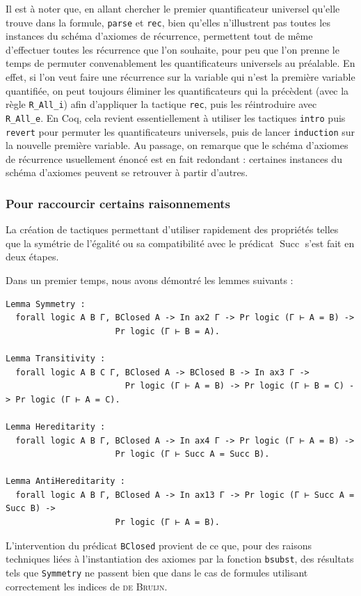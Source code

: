 \documentclass[a4paper]{article}
\DeclareMathOperator{\Succ}{\mathrm{Succ}}
\begin{document}
Il est à noter que, en allant chercher le premier quantificateur universel qu'elle trouve dans la formule, \verb+parse+ et \verb+rec+, bien qu'elles n'illustrent pas toutes les instances du schéma d'axiomes de récurrence, permettent tout de même d'effectuer toutes les récurrence que l'on souhaite, pour peu que l'on prenne le temps de permuter convenablement les quantificateurs universels au préalable. En effet, si l'on veut faire une récurrence sur la variable qui n'est la première variable quantifiée, on peut toujours éliminer les quantificateurs qui la précèdent (avec la règle \verb+R_All_i+) afin d'appliquer la tactique \verb+rec+, puis les réintroduire avec \verb+R_All_e+. En Coq, cela revient essentiellement à utiliser les tactiques \verb+intro+ puis \verb+revert+ pour permuter les quantificateurs universels, puis de lancer \verb+induction+ sur la nouvelle première variable. Au passage, on remarque que le schéma d'axiomes de récurrence usuellement énoncé est en fait redondant : certaines instances du schéma d'axiomes peuvent se retrouver à partir d'autres.

\subsubsection{Pour raccourcir certains raisonnements}

La création de tactiques permettant d'utiliser rapidement des propriétés telles que la symétrie de l'égalité ou sa compatibilité avec le prédicat $\Succ$ s'est fait en deux étapes.

Dans un premier temps, nous avons démontré les lemmes suivants :
\begin{verbatim}
Lemma Symmetry :
  forall logic A B Γ, BClosed A -> In ax2 Γ -> Pr logic (Γ ⊢ A = B) ->
                      Pr logic (Γ ⊢ B = A).

Lemma Transitivity :
  forall logic A B C Γ, BClosed A -> BClosed B -> In ax3 Γ ->
                        Pr logic (Γ ⊢ A = B) -> Pr logic (Γ ⊢ B = C) -> Pr logic (Γ ⊢ A = C).

Lemma Hereditarity :
  forall logic A B Γ, BClosed A -> In ax4 Γ -> Pr logic (Γ ⊢ A = B) ->
                      Pr logic (Γ ⊢ Succ A = Succ B).

Lemma AntiHereditarity :
  forall logic A B Γ, BClosed A -> In ax13 Γ -> Pr logic (Γ ⊢ Succ A = Succ B) ->
                      Pr logic (Γ ⊢ A = B).
\end{verbatim}
L'intervention du prédicat \verb+BClosed+ provient de ce que, pour des raisons techniques liées à l'instantiation des axiomes par la fonction \verb+bsubst+, des résultats tels que \verb+Symmetry+ ne passent bien que dans le cas de formules utilisant correctement les indices de \textsc{de Bruijn}.
\end{document}
